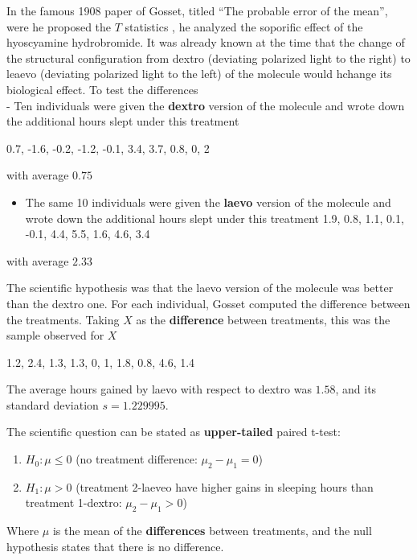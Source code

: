 \documentclass[
]{book}
\providecommand{\tightlist}{%
  \setlength{\itemsep}{0pt}\setlength{\parskip}{0pt}}
\begin{document}
In the famous 1908 paper of Gosset, titled ``The probable error of the mean'', were he proposed the \(T\) statistics \citep{student1908probable}, he analyzed the soporific effect of the hyoscyamine hydrobromide. It was already known at the time that the change of the structural configuration from dextro (deviating polarized light to the right) to leaevo (deviating polarized light to the left) of the molecule would hchange its biological effect. To test the differences\\
- Ten individuals were given the \textbf{dextro} version of the molecule and wrote down the additional hours slept under this treatment

0.7, -1.6, -0.2, -1.2, -0.1, 3.4, 3.7, 0.8, 0, 2

with average \(0.75\)

\begin{itemize}
\tightlist
\item
  The same 10 individuals were given the \textbf{laevo} version of the molecule and wrote down the additional hours slept under this treatment
  1.9, 0.8, 1.1, 0.1, -0.1, 4.4, 5.5, 1.6, 4.6, 3.4
\end{itemize}

with average \(2.33\)

The scientific hypothesis was that the laevo version of the molecule was better than the dextro one. For each individual, Gosset computed the difference between the treatments. Taking \(X\) as the \textbf{difference} between treatments, this was the sample observed for \(X\)

1.2, 2.4, 1.3, 1.3, 0, 1, 1.8, 0.8, 4.6, 1.4

The average hours gained by laevo with respect to dextro was \(1.58\), and its standard deviation \(s=1.229995\).

The scientific question can be stated as \textbf{upper-tailed} paired t-test:

\begin{enumerate}
\def\labelenumi{\alph{enumi}.}
\tightlist
\item
  \(H_0:\mu \leq 0\) (no treatment difference: \(\mu_2-\mu_1=0\))
\item
  \(H_1:\mu > 0\) (treatment 2-laeveo have higher gains in sleeping hours than treatment 1-dextro: \(\mu_2-\mu_1>0\))
\end{enumerate}

Where \(\mu\) is the mean of the \textbf{differences} between treatments, and the null hypothesis states that there is no difference.
\end{document}
